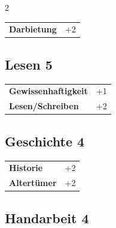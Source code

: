\begin{multicols}{2}
\begin{tcolorbox}
\begin{tabular}{@{}ll@{}}
    \textbf{Darbietung} & +2\\
\end{tabular}


\end{tcolorbox}

\begin{tcolorbox}
    \subsection*{Lesen \hfill \small{5 }}
    \tcblower




\begin{tabular}{@{}ll@{}}
    \textbf{Gewissenhaftigkeit} & +1\\
    \textbf{Lesen/Schreiben} & +2\\
\end{tabular}


\end{tcolorbox}

\begin{tcolorbox}
    \subsection*{Geschichte \hfill \small{4 }}
    \tcblower




\begin{tabular}{@{}ll@{}}
    \textbf{Historie} & +2\\
    \textbf{Altertümer} & +2\\
\end{tabular}


\end{tcolorbox}

\begin{tcolorbox}
    \subsection*{Handarbeit \hfill \small{4 }}
    \tcblower





\end{tcolorbox}
\end{multicols}
